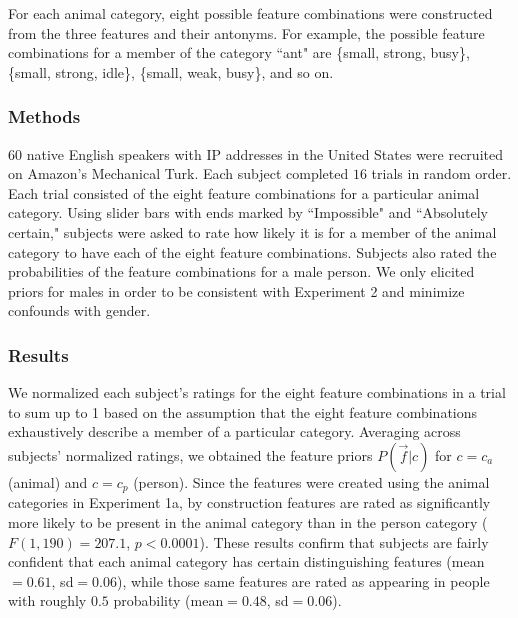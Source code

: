 \documentclass[10pt,letterpaper]{article}
\begin{document}
For each animal category, eight possible feature combinations were constructed from the three features and their antonyms. For example, the possible feature combinations for a member of the category ``ant" are \{small, strong, busy\}, \{small, strong, idle\}, \{small, weak, busy\}, and so on.

\subsubsection{Methods}
$60$ native English speakers with IP addresses in the United States were recruited on Amazon's Mechanical Turk. Each subject completed $16$ trials in random order. Each trial consisted of the eight feature combinations for a particular animal category. Using slider bars with ends marked by ``Impossible" and ``Absolutely certain," subjects were asked to rate how likely it is for a member of the animal category to have each of the eight feature combinations. Subjects also rated the probabilities of the feature combinations for a male person. We only elicited priors for males in order to be consistent with Experiment 2 and minimize confounds with gender.

\subsubsection{Results} 
We normalized each subject's ratings for the eight feature combinations in a trial to sum up to 1 based on the assumption that the eight feature combinations exhaustively describe a member of a particular category. Averaging across subjects' normalized ratings, we obtained the feature priors $P(\vec f | c)$ for $c = c_a$ (animal) and $c = c_p$ (person).
Since the features were created using the animal categories in Experiment 1a, by construction features are rated as significantly more likely to be present in the animal category than in the person category ($F(1, 190) = 207.1$, $p < 0.0001$). These results confirm that subjects are fairly confident that each animal category has certain distinguishing features (mean$= 0.61$, sd$=0.06$), while those same features are rated as appearing in people with roughly $0.5$ probability (mean$=0.48$, sd$=0.06$).

\end{document}
